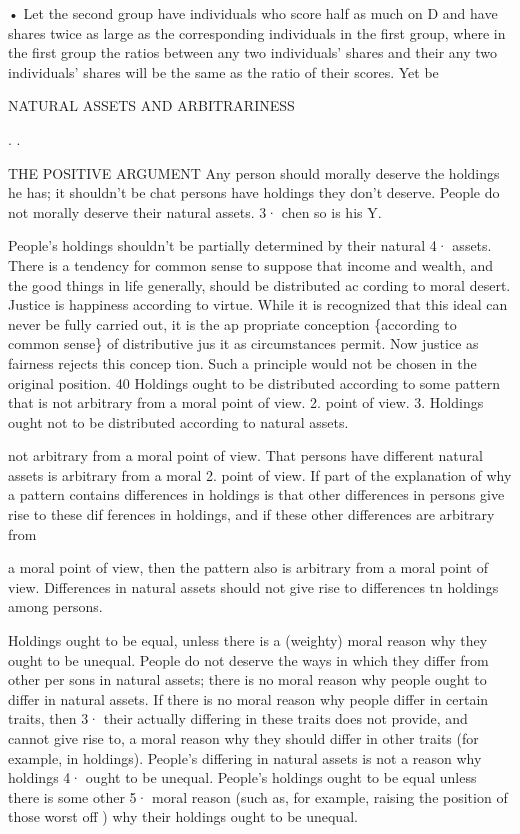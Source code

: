 \documentclass[11pt,openany]{book}
\begin{document}
{• Let the second group have individuals who score half as much on D and have shares twice as large as the corresponding individuals in the first group, where in the first group the ratios between any two individuals' shares and their any two individuals' shares will be the same as the ratio of their scores. Yet be\par

NATURAL ASSETS AND ARBITRARINESS\par

. .\par

THE POSITIVE ARGUMENT Any person should morally deserve the holdings he has; it shouldn't be chat persons have holdings they don't deserve. People do not morally deserve their natural assets. 3· chen so is his Y.\par

People's holdings shouldn't be partially determined by their natural 4· assets. There is a tendency for common sense to suppose that income and wealth, and the good things in life generally, should be distributed ac cording to moral desert. Justice is happiness according to virtue. While it is recognized that this ideal can never be fully carried out, it is the ap propriate conception \{according to common sense\} of distributive jus it as circumstances permit. Now justice as fairness rejects this concep tion. Such a principle would not be chosen in the original position. 40 Holdings ought to be distributed according to some pattern that is not arbitrary from a moral point of view. 2. point of view. 3. Holdings ought not to be distributed according to natural assets.\par

not arbitrary from a moral point of view. That persons have different natural assets is arbitrary from a moral 2. point of view. If part of the explanation of why a pattern contains differences in holdings is that other differences in persons give rise to these dif ferences in holdings, and if these other differences are arbitrary from\par

a moral point of view, then the pattern also is arbitrary from a moral point of view. Differences in natural assets should not give rise to differences tn holdings among persons.\par

Holdings ought to be equal, unless there is a (weighty) moral reason why they ought to be unequal. People do not deserve the ways in which they differ from other per sons in natural assets; there is no moral reason why people ought to differ in natural assets. If there is no moral reason why people differ in certain traits, then 3· their actually differing in these traits does not provide, and cannot give rise to, a moral reason why they should differ in other traits (for example, in holdings). People's differing in natural assets is not a reason why holdings 4· ought to be unequal. People's holdings ought to be equal unless there is some other 5· moral reason (such as, for example, raising the position of those worst off ) why their holdings ought to be unequal.\par

}
\end{document}
